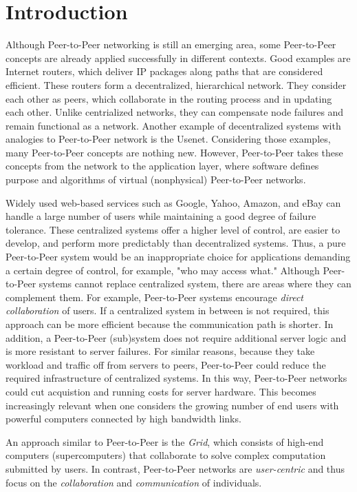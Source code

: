 \documentclass[twocolumn]{article}
\begin{document}
\section{Introduction}
Although Peer-to-Peer networking is still an emerging area, some Peer-to-Peer concepts are already applied successfully in different contexts.
Good examples are Internet routers, which deliver IP packages along paths that are considered efficient. These routers form a decentralized, 
hierarchical network. They consider each other as peers, which collaborate in the routing process and in updating each other. 
Unlike centrialized networks, they can compensate node failures and remain functional as a network.
Another example of decentralized systems with analogies to Peer-to-Peer network is the Usenet.
Considering those examples, many Peer-to-Peer concepts are nothing new. However, Peer-to-Peer takes these concepts from the network to the application layer, where software defines purpose and algorithms of virtual (nonphysical) Peer-to-Peer networks.

Widely used web-based services such as Google, Yahoo, Amazon, and eBay can handle a large number of users while maintaining a good degree of failure tolerance. These centralized systems offer a higher level of control, are easier to develop, and perform more predictably than decentralized systems. Thus, a pure Peer-to-Peer system would be an inappropriate choice for applications demanding a certain degree of control, for example,  "who may access what."
Although Peer-to-Peer systems cannot replace centralized system, there are areas where they can complement them. 
For example, Peer-to-Peer systems encourage \textit{direct collaboration} of users. 
If a centralized system in between is not required, this approach can be more efficient because the communication path is shorter.
In addition, a Peer-to-Peer (sub)system does not require additional server logic and is more resistant to server failures. 
For similar reasons, because they take workload and traffic off from servers to peers, Peer-to-Peer could reduce the required infrastructure of centralized systems. In this way, Peer-to-Peer networks could cut acquistion and running costs for server hardware. This becomes increasingly relevant when one considers the growing number of end users with powerful computers connected by high bandwidth links.

An approach similar to Peer-to-Peer is the \textit{Grid}, which consists of high-end computers (supercomputers) that collaborate to solve complex computation submitted by users.
In contrast, Peer-to-Peer networks are \textit{user-centric }and thus focus on the \textit{collaboration} and \textit{communication} of individuals.
\end{document}
